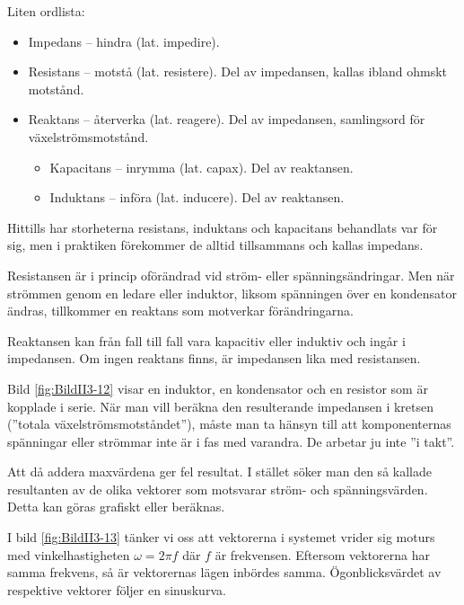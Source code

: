 Liten ordlista:
\begin{itemize}
\item Impedans -- hindra (lat. impedire).
\item Resistans -- motstå (lat. resistere).
  Del av impedansen, kallas ibland ohmskt motstånd.
\item Reaktans -- återverka (lat. reagere).
  Del av impedansen, samlingsord för växelströmsmotstånd.
  \begin{itemize}
  \item Kapacitans -- inrymma (lat. capax). Del av reaktansen.
  \item Induktans -- införa (lat. inducere). Del av reaktansen.
  \end{itemize}
\end{itemize}

Hittills har storheterna resistans, induktans och kapacitans behandlats var för
sig, men i praktiken förekommer de alltid tillsammans och kallas impedans.

Resistansen är i princip oförändrad vid ström- eller spänningsändringar.
Men när strömmen genom en ledare eller induktor, liksom spänningen över en
kondensator ändras, tillkommer en reaktans som motverkar förändringarna.

Reaktansen kan från fall till fall vara kapacitiv eller induktiv och ingår i
impedansen.
Om ingen reaktans finns, är impedansen lika med resistansen.


Bild \ref{fig:BildII3-12} visar en induktor, en kondensator och en resistor
som är kopplade i serie.
När man vill beräkna den resulterande impedansen i kretsen
(''totala växelströmsmotståndet''), måste man ta hänsyn till att komponenternas
spänningar eller strömmar inte är i fas med varandra.
De arbetar ju inte ''i takt''.

Att då addera maxvärdena ger fel resultat.
I stället söker man den så kallade resultanten av de olika vektorer som
motsvarar ström- och spänningsvärden.
Detta kan göras grafiskt eller beräknas.


I bild \ref{fig:BildII3-13} tänker vi oss att vektorerna i systemet vrider sig moturs med vinkelhastigheten
\(\omega = 2\pi f\) där \(f\) är frekvensen.
Eftersom vektorerna har samma frekvens, så är vektorernas lägen inbördes samma.
Ögonblicksvärdet av respektive vektorer följer en sinuskurva.

